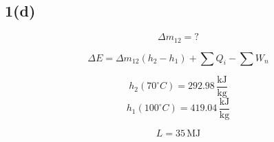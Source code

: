 \subsection*{1(d)}
\begin{equation*}
\Delta m_{12} = ?
\end{equation*}


\begin{equation*}
\Delta E = \Delta m_{12} (h_2 - h_1) + \sum Q_i - \sum W_n
\end{equation*}

\begin{equation*}
h_2 (70^\circ C) = \boxed{292.98 \, \frac{\text{kJ}}{\text{kg}}}
\end{equation*}
\begin{equation*}
h_1 (100^\circ C) = \boxed{419.04 \, \frac{\text{kJ}}{\text{kg}}}
\end{equation*}

\begin{equation*}
L = 35 \, \text{MJ}
\end{equation*}